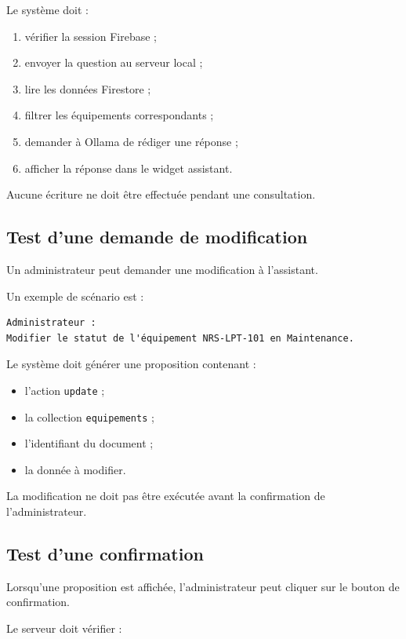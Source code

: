\documentclass{rapportENSIAS}
\begin{document}
Le système doit :

\begin{enumerate}
    \item vérifier la session Firebase ;
    \item envoyer la question au serveur local ;
    \item lire les données Firestore ;
    \item filtrer les équipements correspondants ;
    \item demander à Ollama de rédiger une réponse ;
    \item afficher la réponse dans le widget assistant.
\end{enumerate}

Aucune écriture ne doit être effectuée pendant une consultation.

\subsection{Test d’une demande de modification}

Un administrateur peut demander une modification à l’assistant.

Un exemple de scénario est :

\begin{verbatim}
Administrateur :
Modifier le statut de l'équipement NRS-LPT-101 en Maintenance.
\end{verbatim}

Le système doit générer une proposition contenant :

\begin{itemize}
    \item l’action \texttt{update} ;
    \item la collection \texttt{equipements} ;
    \item l’identifiant du document ;
    \item la donnée à modifier.
\end{itemize}

La modification ne doit pas être exécutée avant la confirmation de l’administrateur.

\subsection{Test d’une confirmation}

Lorsqu’une proposition est affichée, l’administrateur peut cliquer sur le bouton de confirmation.

Le serveur doit vérifier :
\end{document}
